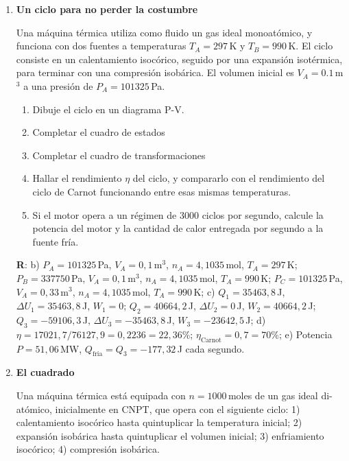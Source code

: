 \documentclass[a4paper,12pt]{article}
\begin{document}
\begin{enumerate}
	\item {\bf{Un ciclo para no perder la costumbre}}
		
		Una máquina térmica utiliza como fluido un gas ideal monoatómico, y
		funciona con dos fuentes a temperaturas $T_A = 297$\,K y $T_B =
		990$\,K. El ciclo consiste en un calentamiento isocórico, seguido por
		una expansión isotérmica, para terminar con una compresión isobárica.
		El volumen inicial es $V_A=0.1$\,m$^3$ a una presión de
		$P_A=101325$\,Pa.
		
		\begin{enumerate}
			\item Dibuje el ciclo en un diagrama P-V.
			\item Completar el cuadro de estados 
			\item Completar el cuadro de transformaciones
			\item Hallar el rendimiento $\eta$ del ciclo, y compararlo con el
				rendimiento del ciclo de Carnot funcionando entre esas mismas
				temperaturas.
			\item Si el motor opera a un régimen de $3000$ ciclos por segundo,
				calcule la potencia del motor y la cantidad de calor entregada
				por segundo a la fuente fría.
		\end{enumerate}
		{\bf{R}}: b) $P_A=101325$\,Pa, $V_A=0,1$\,m$^3$, $n_A=4,1035$\,mol,
		$T_A=297$\,K; $P_B=337750$\,Pa, $V_A=0,1$\,m$^3$, $n_A=4,1035$\,mol,
		$T_A=990$\,K; $P_C=101325$\,Pa, $V_A=0,33$\,m$^3$, $n_A=4,1035$\,mol,
		$T_A=990$\,K; c) $Q_1=35463,8$\,J, $\Delta U_1=35463,8$\,J, $W_1=0$;
		$Q_2=40664,2$\,J, $\Delta U_2=0$\,J, $W_2=40664,2$\,J;
		$Q_3=-59106,3$\,J, $\Delta U_3=-35463,8$\,J, $W_3=-23642,5$\,J; d)
		$\eta=17021,7/76127,9 = 0,2236 = 22,36\%$; $\eta_{\mathrm{Carnot}} =
		0,7 = 70\%$; e) Potencia $P=51,06$\,MW,
		$Q_{\mathrm{fria}}=Q_3=-177,32$\,J cada segundo.
	
	\item {\bf{El cuadrado}}
		
		Una máquina térmica está equipada con $n=1000$\,moles de un gas ideal
		di-atómico, inicialmente en CNPT, que opera con el siguiente ciclo: 1)
		calentamiento isocórico hasta quintuplicar la temperatura inicial; 2)
		expansión isobárica hasta quintuplicar el volumen inicial; 3)
		enfriamiento isocórico; 4) compresión isobárica.
		

\end{enumerate}
\end{document}
